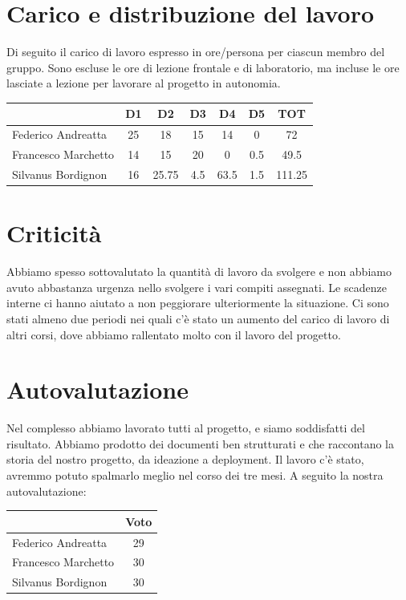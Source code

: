 \documentclass[a4paper,12pt]{article}
\begin{document}
\section{Carico e distribuzione del lavoro}

Di seguito il carico di lavoro espresso in ore/persona per ciascun membro del gruppo. Sono escluse le ore di lezione frontale e di laboratorio, ma incluse le ore lasciate a lezione per lavorare al progetto in autonomia.

\begin{tabular}{|l|c|c|c|c|c|c|}
    \hline
    & \textbf{D1} & \textbf{D2} & \textbf{D3} & \textbf{D4} & \textbf{D5} & \textbf{TOT} \\ \hline
    Federico Andreatta & 25 & 18 & 15 & 14 & 0 & 72 \\ \hline
    Francesco Marchetto & 14 & 15 & 20 & 0 & 0.5 & 49.5 \\ \hline
    Silvanus Bordignon & 16 & 25.75 & 4.5 & 63.5 & 1.5 & 111.25 \\ \hline
\end{tabular}

\section{Criticità}

Abbiamo spesso sottovalutato la quantità di lavoro da svolgere e non abbiamo avuto abbastanza urgenza nello svolgere i vari compiti assegnati. Le scadenze interne ci hanno aiutato a non peggiorare ulteriormente la situazione. Ci sono stati almeno due periodi nei quali c'è stato un aumento del carico di lavoro di altri corsi, dove abbiamo rallentato molto con il lavoro del progetto.

\section{Autovalutazione}

Nel complesso abbiamo lavorato tutti al progetto, e siamo soddisfatti del risultato. Abbiamo prodotto dei documenti ben strutturati e che raccontano la storia del nostro progetto, da ideazione a deployment. Il lavoro c'è stato, avremmo potuto spalmarlo meglio nel corso dei tre mesi. A seguito la nostra autovalutazione:

\begin{tabular}{|l|c|}
    \hline
    & Voto \\ \hline
    Federico Andreatta & 29 \\ \hline
    Francesco Marchetto & 30 \\ \hline
    Silvanus Bordignon & 30 \\ \hline
\end{tabular}
\end{document}
